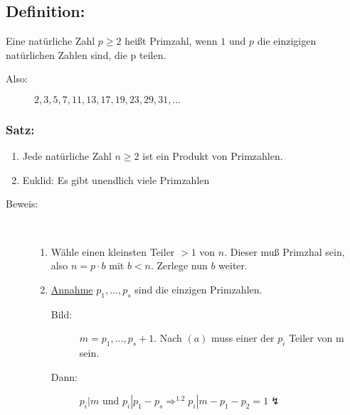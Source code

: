 \subsection{Definition:} Eine natürliche Zahl $p \geq 2$ heißt Primzahl, wenn $1$ und $p$ die einzigigen natürlichen Zahlen 
				sind, die p teilen.
\begin{description}
	\item[Also:] $2, 3, 5, 7, 11, 13, 17, 19, 23, 29, 31, \dotsc  $
\end{description}
%
%
%
\subsubsection{Satz:}

\begin{enumerate}[label={\alph*)}]
     \item Jede natürliche Zahl $n \geq 2$ ist ein Produkt von Primzahlen.
     \item Euklid: Es gibt unendlich viele Primzahlen
\end{enumerate}
\begin{description}
	\item[Beweis:] \quad \\
		\begin{enumerate}[label={\alph*)}]
			\item Wähle einen kleinsten Teiler $> 1$ von $n$. Dieser muß Primzhal sein, also $n=p \cdot b$ mit $b < 
				n$. Zerlege nun $b$ weiter.
			\item \underline{Annahme} $p_{1}, \dotsc  , p_{s}$ sind die einzigen Primzahlen. 
			\begin{description}
				\item[Bild:] $m=p_{1}, \dotsc  , p_{s}+1$. Nach $(a)$ muss einer der $p_{i}$ Teiler von m 
					      sein.
				\item[Dann:] $p_{i}|m$ und $p_{i}|p_{1}-p_{s} \Rightarrow ^{1.2} p_{i}| m-p_{1}-p_{2} = 1 
						\lightning$
			\end{description}
		\end{enumerate}
\end{description}
%
%
%
